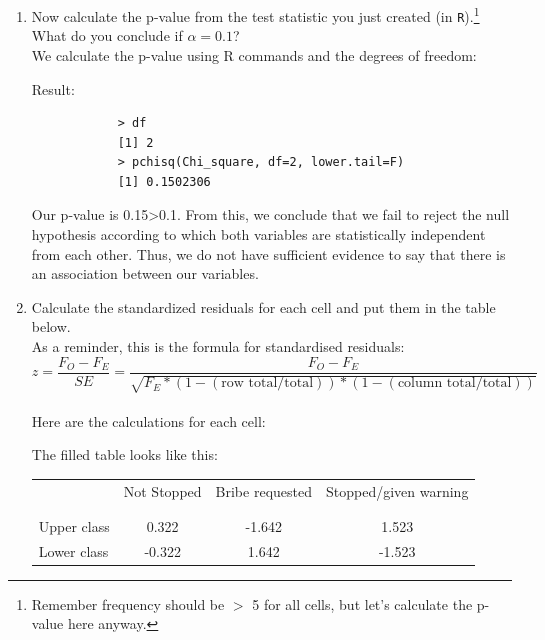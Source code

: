 \documentclass[12pt,letterpaper]{article}
\begin{document}
\begin{enumerate}
		
		
		\vspace{.2cm}
		\item [(b)]
		Now calculate the p-value from the test statistic you just created (in \texttt{R}).\footnote{Remember frequency should be $>$ 5 for all cells, but let's calculate the p-value here anyway.}  What do you conclude if $\alpha = 0.1$?\\
		
		We calculate the p-value using R commands and the degrees of freedom:
		  
		\newpage
		Result:
		\begin{verbatim}
			> df
			[1] 2
			> pchisq(Chi_square, df=2, lower.tail=F)
			[1] 0.1502306
		\end{verbatim}
		Our p-value is 0.15\textgreater0.1. From this, we conclude that we fail to reject the null hypothesis according to which both variables are statistically independent from each other. Thus, we do not have sufficient evidence to say that there is an association between our variables.
		
		
		\vspace{1cm}
		\item [(c)] Calculate the standardized residuals for each cell and put them in the table below. \\
		
		As a reminder, this is the formula for standardised residuals: \\
		$$z = \frac{F_O - F_E}{SE} = \frac{F_O - F_E}{\sqrt{F_E * (1-(\text{row total}/\text{total}))*(1-(\text{column total}/\text{total}))}} $$ \\
		
		Here are the calculations for each cell:
		
		The filled table looks like this:
		
		
		\begin{table}[h]
			\centering
			\begin{tabular}{l | c c c }
				& Not Stopped & Bribe requested & Stopped/given warning \\
				\\[-1.8ex]
				\hline \\[-1.8ex]
				Upper class  & 0.322 & -1.642 & 1.523 \\
				
				Lower class & -0.322
				& 1.642  & -1.523  \\
				

\end{tabular}
\end{table}
\end{enumerate}
\end{document}
